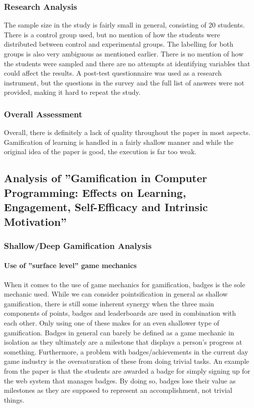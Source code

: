 \subsubsection{Research Analysis}
The sample size in the study is fairly small in general, consisting of 20 students. There is a control group used, but no mention of how the students were distributed between control and experimental groups. The labelling for both groups is also very ambiguous as mentioned earlier. There is no mention of how the students were sampled and there are no attempts at identifying variables that could affect the results. A post-test questionnaire was used as a research instrument, but the questions in the survey and the full list of answers were not provided, making it hard to repeat the study. 

\subsubsection{Overall Assessment}
Overall, there is definitely a lack of quality throughout the paper in most aspects. Gamification of learning is handled in a fairly shallow manner and while the original idea of the paper is good, the execution is far too weak. 




\subsection{Analysis of ''Gamification in Computer Programming: Effects on Learning, Engagement, Self-Efficacy and Intrinsic Motivation''}
\subsubsection{Shallow/Deep Gamification Analysis}
\paragraph{Use of ''surface level'' game mechanics}
When it comes to the use of game mechanics for gamification, badges is the sole mechanic used. While we can consider pointsification in general as shallow gamification, there is still some inherent synergy when the three main components of points, badges and leaderboards are used in combination with each other. Only using one of these makes for an even shallower type of gamification. Badges in general can barely be defined as a game mechanic in isolation as they ultimately are a milestone that displays a person's progress at something. Furthermore, a problem with badges/achievements in the current day game industry is the oversaturation of these from doing trivial tasks. An example from the paper is that the students are awarded a badge for simply signing up for the web system that manages badges. By doing so, badges lose their value as milestones as they are supposed to represent an accomplishment, not trivial things. 

